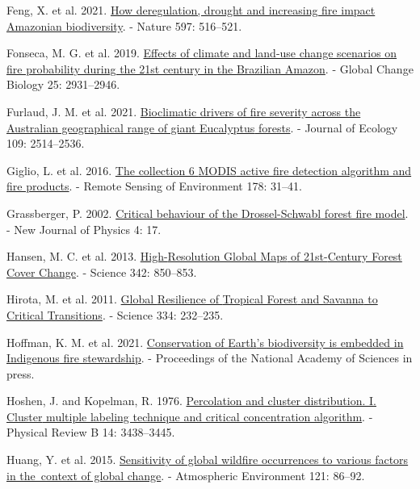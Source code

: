 \documentclass[
]{article}
\newlength{\cslhangindent}
\newenvironment{CSLReferences}[2] %
 {\begin{list}{}{%
  \setlength{\itemindent}{0pt}
  \setlength{\leftmargin}{0pt}
  \setlength{\parsep}{0pt}
  \ifodd #1
   \setlength{\leftmargin}{\cslhangindent}
   \setlength{\itemindent}{-1\cslhangindent}
  \fi
  \setlength{\itemsep}{#2\baselineskip}}}
 {\end{list}}
\begin{document}
\begin{CSLReferences}{1}{1}
Feng, X. et al. 2021.
\href{https://doi.org/10.1038/s41586-021-03876-7}{How deregulation,
drought and increasing fire impact {Amazonian} biodiversity}. - Nature
597: 516--521.

Fonseca, M. G. et al. 2019.
\href{https://doi.org/10.1111/gcb.14709}{Effects of climate and land-use
change scenarios on fire probability during the 21st century in the
{Brazilian Amazon}}. - Global Change Biology 25: 2931--2946.

Furlaud, J. M. et al. 2021.
\href{https://doi.org/10.1111/1365-2745.13663}{Bioclimatic drivers of
fire severity across the {Australian} geographical range of giant
{Eucalyptus} forests}. - Journal of Ecology 109: 2514--2536.

Giglio, L. et al. 2016.
\href{https://doi.org/10.1016/j.rse.2016.02.054}{The collection 6
{MODIS} active fire detection algorithm and fire products}. - Remote
Sensing of Environment 178: 31--41.

Grassberger, P. 2002.
\href{https://doi.org/10.1088/1367-2630/4/1/317}{Critical behaviour of
the {Drossel-Schwabl} forest fire model}. - New Journal of Physics 4:
17.

Hansen, M. C. et al. 2013.
\href{https://doi.org/10.1126/science.1244693}{High-{Resolution Global
Maps} of 21st-{Century Forest Cover Change}}. - Science 342: 850--853.

Hirota, M. et al. 2011.
\href{https://doi.org/10.1126/science.1210657}{Global {Resilience} of
{Tropical Forest} and {Savanna} to {Critical Transitions}}. - Science
334: 232--235.

Hoffman, K. M. et al. 2021.
\href{https://doi.org/10.1073/pnas.2105073118}{Conservation of {Earth}'s
biodiversity is embedded in {Indigenous} fire stewardship}. -
Proceedings of the National Academy of Sciences in press.

Hoshen, J. and Kopelman, R. 1976.
\href{https://doi.org/10.1103/PhysRevB.14.3438}{Percolation and cluster
distribution. {I}. {Cluster} multiple labeling technique and critical
concentration algorithm}. - Physical Review B 14: 3438--3445.

Huang, Y. et al. 2015.
\href{https://doi.org/10.1016/j.atmosenv.2015.06.002}{Sensitivity of
global wildfire occurrences to various factors in the~context of global
change}. - Atmospheric Environment 121: 86--92.


\end{CSLReferences}
\end{document}
